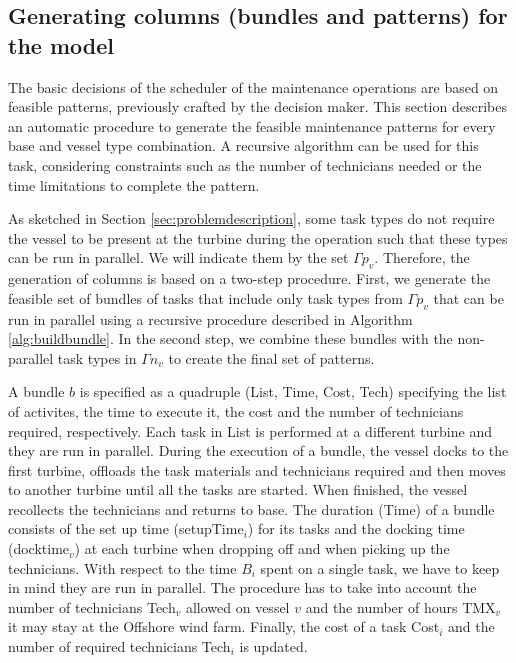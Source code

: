 \subsection{Generating columns (bundles and patterns) for the model}
The basic decisions of the scheduler of the maintenance operations are based on feasible patterns, previously crafted by the decision maker. This section describes an automatic procedure to generate the feasible maintenance patterns for every base and vessel type combination. A recursive algorithm can be used for this task, considering constraints such as the number of technicians needed or the time limitations to complete the pattern. 

As sketched in Section \ref{sec:problemdescription}, some task types do not require the vessel to be present at the turbine during the operation such that these types can be run in parallel. We will indicate them by the set $\Gamma p_v$. Therefore, the generation of columns is based on a two-step procedure. First, we generate the feasible set of bundles of tasks that include only task types from $\Gamma p_v$ that can be run in parallel using a recursive procedure described in Algorithm \ref{alg:buildbundle}. In the second step, we combine these bundles with the non-parallel task types in $\Gamma n_v$ to create the final set of patterns.


A bundle $b$ is specified as a quadruple (List, Time, Cost, Tech) specifying the list of activites, the time to execute it, the cost and the number of technicians required, respectively. Each task in List is performed at a different turbine and they are run in parallel. During the execution of a bundle, the vessel docks to the first turbine, offloads the task materials and technicians required and then moves to another turbine until all the tasks are started. When finished, the vessel recollects the technicians and returns to base. The duration (Time) of a bundle consists of the set up time (setupTime$_i$) for its tasks and the docking time (docktime$_v$) at each turbine when dropping off and when picking up the technicians. With respect to the time $B_i$ spent on a single task, we have to keep in mind they are run in parallel. The procedure has to take into account the number of technicians Tech$_v$ allowed on vessel $v$ and the number of hours TMX$_v$ it may stay at the Offshore wind farm. Finally, the cost of a task Cost$_i$ and the number of required technicians Tech$_i$ is updated.

